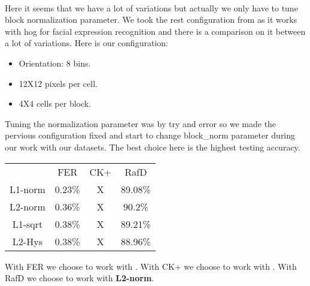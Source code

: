\paragraph{}
Here it seems that we have a lot of variations but actually we only have to tune block normalization parameter.
\newline
We took the rest configuration from \cite{hog} as it works with hog for facial expression recognition and there is a comparison on it between a lot of variations.
\newline Here is our configuration: \newline
\begin{itemize}
\item Orientation: 8 bins. \item 12X12 pixels per cell. \item 4X4 cells per block.
\end{itemize}

Tuning the normalization parameter was by try and error so we made the pervious configuration fixed and start to change block\_norm parameter during our work with our datasets.
\newline
The best choice here is the highest testing accuracy.
\newline
\begin{center}
\begin{tabular}{ |c|c|c|c| }
\hline
  & FER & CK+ & RafD \\ 
 L1-norm & 0.23\% & X & 89.08\% \\  
 L2-norm & 0.36\% & X & 90.2\% \\
 L1-sqrt & 0.38\% & X & 89.21\% \\
 L2-Hys & 0.38\% & X & 88.96\% \\
\hline
\end{tabular}
\end{center}
With FER we choose to work with  .\newline
With CK+ we choose to work with  .\newline
With RafD we choose to work with  \textbf{L2-norm}. \newline
\paragraph{}
